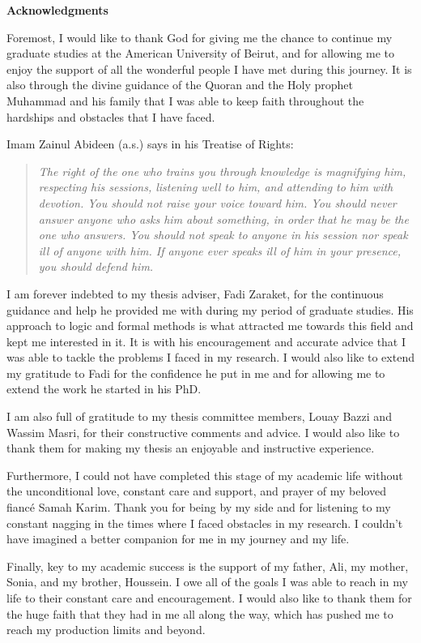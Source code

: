 \clearpage

\thispagestyle{plain}
\setcounter{page}{5}

\begin{center}
\LARGE{{\bf Acknowledgments}}
\end{center}

Foremost, I would like to thank God for giving me the chance to continue
my graduate studies at the American University of Beirut, and for allowing
me to enjoy the support of all the wonderful people I have met during this journey. 
It is also through the divine guidance of the Quoran and the Holy prophet Muhammad and
his family that I was able to keep faith throughout the hardships and obstacles 
that I have faced.

Imam Zainul Abideen (a.s.) says in his Treatise of Rights:
\begin{quotation}
{\em The right of the one who trains you through knowledge is magnifying him, respecting
his sessions, listening well to him, and attending to him with devotion. You should not raise
your voice toward him. You should never answer anyone who asks him about something, in order that he may be the one who answers. You should not speak to anyone in his session
nor speak ill of anyone with him. If anyone ever speaks ill of him in your presence, you
should defend him.}
\end{quotation}
I am forever indebted to my thesis adviser, Fadi Zaraket, for the continuous guidance and help 
he provided me with during my period of graduate studies. His approach to logic and formal methods
is what attracted me towards this field and kept me interested in it. It is with 
his encouragement and accurate advice that I was able to tackle the problems I faced in my research. 
I would also like to extend my gratitude to Fadi for the confidence he put in me and for allowing me 
to extend the work he started in his PhD. 

I am also full of gratitude to my thesis committee members, Louay Bazzi and Wassim Masri, for their 
constructive comments and advice. I would also like to thank them for making my thesis an enjoyable
and  instructive experience. 

Furthermore, I could not have completed this stage of my academic life without the unconditional love,
constant care and support, and prayer of my beloved fianc\'{e} Samah Karim. Thank you for being by my side
and for listening to my constant nagging in the times where I faced obstacles in my research. I couldn't have 
imagined a better companion for me in my journey and my life. 

Finally, key to my academic success is the support
of my father, Ali, my mother, Sonia, 
and my brother, Houssein. I owe all of the goals I was able to reach in my life to their constant
care and encouragement. I would also like to thank them for the huge faith that they had in me 
all along the way, which has pushed me to reach my production limits and beyond. 
